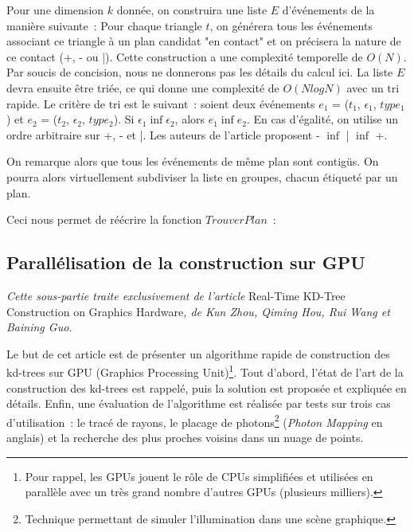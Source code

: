 \documentclass[a4paper]{article}
\begin{document}
Pour une dimension $k$ donnée, on construira une liste $E$ d'événements de la manière suivante~: Pour chaque triangle $t$, on générera tous les événements associant ce triangle à un plan candidat "en contact" et on précisera la nature de ce contact (+, - ou |). Cette construction a une complexité temporelle de $O(N)$. Par soucis de concision, nous ne donnerons pas les détails du calcul ici. La liste $E$ devra ensuite être triée, ce qui donne une complexité de $O(NlogN)$ avec un tri rapide. Le critère de tri est le suivant~: soient deux événements $e_1$ = ($t_1$, $\epsilon_1$, $type_1$) et $e_2$ = ($t_2$, $\epsilon_2$, $type_2$). Si $\epsilon_1 \inf \epsilon_2$, alors $e_1 \inf e_2$. En cas d'égalité, on utilise un ordre arbitraire sur +, - et |. Les auteurs de l'article proposent - $\inf$ | $\inf$ +.

On remarque alors que tous les événements de même plan sont contigüs. On pourra alors virtuellement subdiviser la liste en groupes, chacun étiqueté par un plan.

Ceci nous permet de réécrire la fonction $TrouverPlan$~:

\subsection{Parallélisation de la construction sur GPU}

\textit{Cette sous-partie traite exclusivement de l'article} Real-Time KD-Tree Construction on Graphics Hardware\textit{, de Kun Zhou, Qiming Hou, Rui Wang et Baining Guo.}

Le but de cet article est de présenter un algorithme rapide de construction des kd-trees sur GPU (Graphics Processing Unit)\footnote{Pour rappel, les GPUs jouent le rôle de CPUs simplifiées et utilisées en parallèle avec un très grand nombre d'autres GPUs (plusieurs milliers).}. Tout d'abord, l'état de l'art de la construction des kd-trees est rappelé, puis la solution est proposée et expliquée en détails. Enfin, une évaluation de l'algorithme est réalisée par tests sur trois cas d'utilisation~: le tracé de rayons, le placage de photons\footnote{Technique permettant de simuler l'illumination dans une scène graphique.} (\textit{Photon Mapping} en anglais) et la recherche des plus proches voisins dans un nuage de points.
\end{document}
